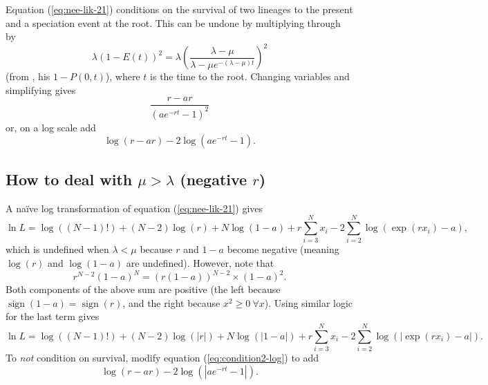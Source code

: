 \documentclass[12pt]{article}
\newcommand{\sign}{\mathop{\mathrm{sign}}}
\begin{document}
Equation (\ref{eq:nee-lik-21}) conditions on the survival of two
lineages to the present and a speciation event at the root.  This can
be undone by multiplying through by
\begin{equation}
  \label{eq:contition}
  \lambda (1-E(t))^2 = \lambda\left(\frac{\lambda - \mu}{
      \lambda-\mu e^{-(\lambda-\mu)t}}\right)^2
\end{equation}
(from \citealt{Nee-1994-305}, his $1-P(0,t)$), where $t$ is the time
to the root.  Changing variables and simplifying gives
\begin{equation}
  \label{eq:condition2}
  \frac{r - ar}{(a e^{-rt} - 1)^2}
\end{equation}
or, on a log scale add
\begin{equation}
  \label{eq:condition2-log}
  \log(r - ar) - 2\log(a e^{-rt} - 1).
\end{equation}

\subsection{How to deal with $\mu > \lambda$ (negative $r$)}
A na\"ive log transformation of equation (\ref{eq:nee-lik-21})
gives
\begin{equation}
  \label{eq:nee-lik-21-log}
  \ln L = \log((N-1)!) + (N-2)\log(r) + N\log(1-a) + r\sum_{i=3}^Nx_i
  - 2\sum_{i=2}^{N}\log(\exp(r x_i) - a),
\end{equation}
which is undefined when $\lambda < \mu$ because $r$ and $1-a$ become
negative (meaning $\log(r)$ and $\log(1-a)$ are undefined).  However,
note that 
\begin{equation*}
  r^{N-2}(1-a)^N = (r(1-a))^{N-2}\times (1-a)^2.
\end{equation*}
Both components of the above sum are positive (the left because
$\sign(1-a) = \sign(r)$, and the right because $x^2 \ge 0~\forall
x$).  Using similar logic for the last term gives
\begin{equation}
  \label{eq:nee-lik-21-log2}
  \ln L = \log((N-1)!) + (N-2)\log(|r|) + N\log(|1-a|) + r\sum_{i=3}^Nx_i
  - 2\sum_{i=2}^{N}\log(|\exp(r x_i) - a|).
\end{equation}
To \textit{not} condition on survival, modify equation
(\ref{eq:condition2-log}) to add
\begin{equation}
  \label{eq:condition2-log}
  \log(r - ar) - 2\log(|a e^{-rt} - 1|).
\end{equation}
\end{document}
